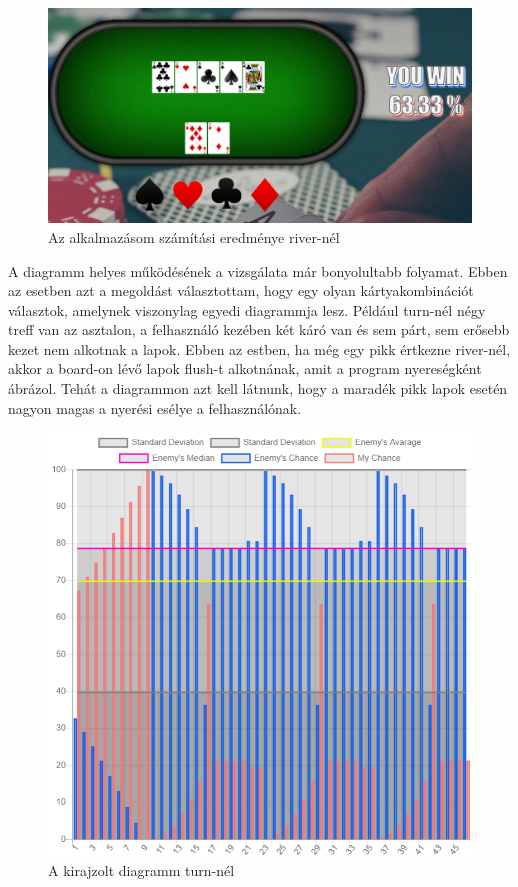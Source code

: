 \begin{figure}[h]
\centering
\includegraphics[scale=0.47]{images/test-my.png}
\caption{Az alkalmazásom számítási eredménye river-nél}
\label{fig:test-my}
\end{figure}

A diagramm helyes működésének a vizsgálata már bonyolultabb folyamat. Ebben az esetben azt a megoldást választottam, hogy egy olyan kártyakombinációt választok, amelynek viszonylag egyedi diagrammja lesz. Például turn-nél négy treff van az asztalon, a felhasználó kezében két káró van és sem párt, sem erősebb kezet nem alkotnak a lapok. Ebben az estben, ha még egy pikk értkezne river-nél, akkor a board-on lévő lapok flush-t alkotnának, amit a program nyereségként ábrázol. Tehát a diagrammon azt kell látnunk, hogy a maradék pikk lapok esetén nagyon magas a nyerési esélye a felhasználónak.

\begin{figure}[h]
\centering
\includegraphics[scale=0.9]{images/chart-test.png}
\caption{A kirajzolt diagramm turn-nél}
\label{fig:chart-test}
\end{figure}

